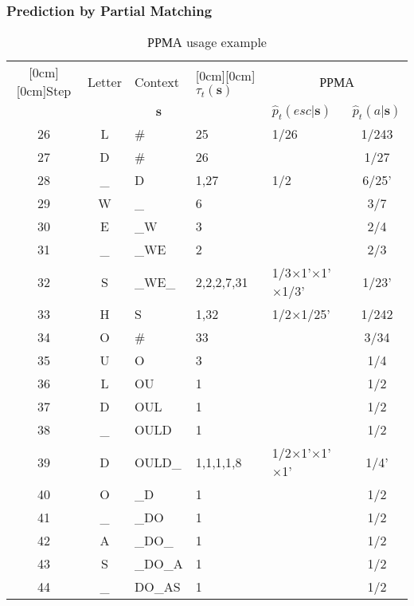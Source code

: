 \documentclass[14pt]{beamer}
\renewcommand{\vec}[1]{\ensuremath{\boldsymbol{#1}}}
\begin{document}
\begin{frame}
\frametitle{Prediction by Partial Matching}
\begin{itemize}    

    \begin{table}[htbp]
    \caption{РРМА usage example}
    \scriptsize{
    \begin{center}
    \scalebox{0.7} {
    \begin{tabular}
    {|c|c|l|l|l|c|} \hline %
    \raisebox{-1.50ex}[0cm][0cm]{Step}&
    {Letter}&
    {Context }&
    \raisebox{-1.50ex}[0cm][0cm]{$\tau _t ({\vec s})$}&
    \multicolumn{2}{c|}{РРМА}  \\
    \cline{5-6}
     & &\multicolumn{1}{c|}{$\vec s$}& &
    $\hat {p}_t(esc\vert {\vec s})$& $\hat {p}_t(a\vert {\vec s})$ \\ \hline%
    26& L& {\#}& 25& 1/26& 1/243 \\ \hline %
    27& D& {\#}& 26& & 1/27 \\ \hline %
    28& {\_}& D& 1,27& 1/2& 6/25' \\ \hline %
    29& W& {\_}& 6& & 3/7 \\ \hline %
    30& E& {\_}W& 3& & 2/4 \\ \hline %
    31& {\_}& {\_}WE& 2& & 2/3 \\ \hline %
    32& S& {\_}WE{\_}& 2,2,2,7,31& 1/3$\times $1'$\times $1'$\times
          $1/3'& 1/23' \\ \hline %
    33& H& S& 1,32& 1/2$\times $1/25'& 1/242 \\ \hline %
    34& O& {\#}& 33& & 3/34 \\ \hline %
    35& U& O& 3& & 1/4 \\ \hline %
    36& L& OU& 1& & 1/2 \\ \hline %
    37& D& OUL& 1& & 1/2 \\ \hline %
    38& {\_}& OULD& 1& & 1/2 \\ \hline %
    39& D& OULD{\_}& 1,1,1,1,8& 1/2$\times $1'$\times $1'$\times $1'&
        1/4' \\ \hline %
    40& O& {\_}D& 1& & 1/2 \\ \hline %
    41& {\_}& {\_}DO& 1& & 1/2 \\ \hline %
    42& A& {\_}DO{\_}& 1& & 1/2 \\ \hline %
    43& S& {\_}DO{\_}A& 1& & 1/2 \\ \hline %
    44& {\_}& DO{\_}AS& 1& & 1/2 \\ \hline %

\end{tabular}}
\end{center}}
\end{table}
\end{itemize}
\end{frame}
\end{document}
